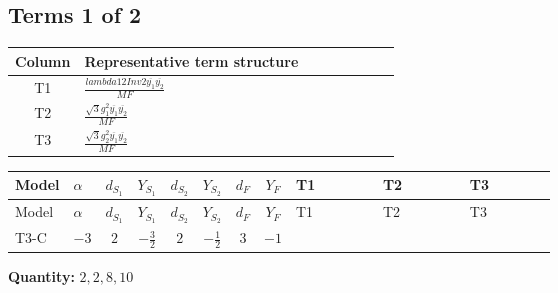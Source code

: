 \documentclass[8pt]{article}
\begin{document}
\begin{landscape}
\subsection*{Terms 1 of 2}
\begin{center}
\begin{tabular}{@{}c >{\raggedright\arraybackslash}p{0.82\linewidth}@{}}
\toprule
Column & Representative term structure \\
\midrule
T1 & \(\displaystyle \frac{lambda12Inv2 \overline{y_{1}} \overline{y_{2}}}{MF}\) \\
\midrule
T2 & \(\displaystyle \frac{\sqrt{3} g_{1}^{2} \overline{y_{1}} \overline{y_{2}}}{MF}\) \\
\midrule
T3 & \(\displaystyle \frac{\sqrt{3} g_{2}^{2} \overline{y_{1}} \overline{y_{2}}}{MF}\) \\
\midrule
\bottomrule
\end{tabular}
\end{center}
\smallskip
\tiny
\begin{longtable}{@{}llcccccc >{\raggedright\arraybackslash}p{0.21\linewidth} >{\raggedright\arraybackslash}p{0.21\linewidth} >{\raggedright\arraybackslash}p{0.21\linewidth}@{}}
\toprule
Model & $\alpha$ & $d_{S_1}$ & $Y_{S_1}$ & $d_{S_2}$ & $Y_{S_2}$ & $d_F$ & $Y_F$ & T1 & T2 & T3 \\
\midrule
\endfirsthead
\toprule
Model & $\alpha$ & $d_{S_1}$ & $Y_{S_1}$ & $d_{S_2}$ & $Y_{S_2}$ & $d_F$ & $Y_F$ & T1 & T2 & T3 \\
\midrule
\endhead
T3-C & $-3$ & $2$ & $-\frac{3}{2}$ & $2$ & $-\frac{1}{2}$ & $3$ & $-1$ & \scriptsize\adjustbox{max width=\linewidth}{$\begin{gathered} - \frac{lambda12Inv2 \overline{y_{1}} \overline{y_{2}}}{3 MF}\end{gathered}$} & \scriptsize\adjustbox{max width=\linewidth}{$\begin{gathered} - \frac{\sqrt{3} g_{1}^{2} \overline{y_{1}} \overline{y_{2}}}{2 MF}\end{gathered}$} & \scriptsize\adjustbox{max width=\linewidth}{$\begin{gathered} - \frac{\sqrt{3} g_{2}^{2} \overline{y_{1}} \overline{y_{2}}}{4 MF}\end{gathered}$} \\
\midrule
\bottomrule
\end{longtable}
\clearpage
\noindent\textbf{Quantity: }$\mathrm{2,2,8,10}$\par\smallskip

\end{landscape}
\end{document}
